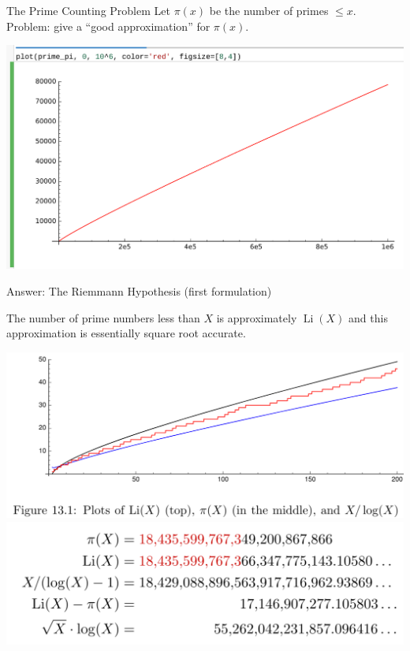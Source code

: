 \documentclass{beamer}
\DeclareMathOperator{\Li}{Li}
\begin{document}
\begin{frame}{The Prime Counting Problem}
  Let $\pi(x)$ be the number of primes $\leq x$.\\
  Problem: give a ``good approximation'' for $\pi(x)$.
  \vfill

  \includegraphics[width=.98\textwidth]{pics/prime-pi-1000000.png}

\end{frame}

\begin{frame}{Answer: The Riemmann Hypothesis (first formulation)}
  \begin{block}{}
    The number of prime numbers less than $X$ is
    approximately $\Li(X)$ and this approximation is essentially square
    root accurate.
  \end{block}
  \begin{center}
    \includegraphics[width=.5\textwidth]{pics/plot-pi-Li.png}
    \includegraphics[width=.5\textwidth]{pics/ten24.png}
  \end{center}
\end{frame}
\end{document}
